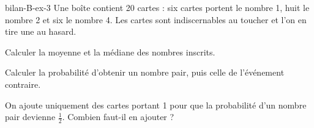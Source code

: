 \begin{blocEdition}{bilan-B-ex-3}
Une boîte contient 20 cartes : six cartes portent le nombre 1, huit le nombre 2 et six le nombre 4. Les cartes sont indiscernables au toucher et l’on en tire une au hasard.\begin{questions}
\item Calculer la moyenne et la médiane des nombres inscrits.
\item Calculer la probabilité d’obtenir un nombre pair, puis celle de l’événement contraire.
\item On ajoute uniquement des cartes portant 1 pour que la probabilité d’un nombre pair devienne $\frac12$. Combien faut-il en ajouter ?
\end{questions}\par{}\par\par{}\par{}\par{}\par{}\par{}\par{}
\end{blocEdition}
